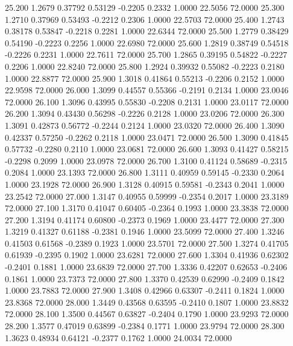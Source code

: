   25.200   1.2679   0.37792   0.53129  -0.2205   0.2332   1.0000  22.5056  72.0000
  25.300   1.2710   0.37969   0.53493  -0.2212   0.2306   1.0000  22.5703  72.0000
  25.400   1.2743   0.38178   0.53847  -0.2218   0.2281   1.0000  22.6344  72.0000
  25.500   1.2779   0.38429   0.54190  -0.2223   0.2256   1.0000  22.6980  72.0000
  25.600   1.2819   0.38749   0.54518  -0.2226   0.2231   1.0000  22.7611  72.0000
  25.700   1.2865   0.39195   0.54822  -0.2227   0.2206   1.0000  22.8240  72.0000
  25.800   1.2924   0.39932   0.55082  -0.2223   0.2180   1.0000  22.8877  72.0000
  25.900   1.3018   0.41864   0.55213  -0.2206   0.2152   1.0000  22.9598  72.0000
  26.000   1.3099   0.44557   0.55366  -0.2191   0.2134   1.0000  23.0046  72.0000
  26.100   1.3096   0.43995   0.55830  -0.2208   0.2131   1.0000  23.0117  72.0000
  26.200   1.3094   0.43430   0.56298  -0.2226   0.2128   1.0000  23.0206  72.0000
  26.300   1.3091   0.42873   0.56772  -0.2244   0.2124   1.0000  23.0320  72.0000
  26.400   1.3090   0.42337   0.57250  -0.2262   0.2118   1.0000  23.0471  72.0000
  26.500   1.3090   0.41845   0.57732  -0.2280   0.2110   1.0000  23.0681  72.0000
  26.600   1.3093   0.41427   0.58215  -0.2298   0.2099   1.0000  23.0978  72.0000
  26.700   1.3100   0.41124   0.58689  -0.2315   0.2084   1.0000  23.1393  72.0000
  26.800   1.3111   0.40959   0.59145  -0.2330   0.2064   1.0000  23.1928  72.0000
  26.900   1.3128   0.40915   0.59581  -0.2343   0.2041   1.0000  23.2542  72.0000
  27.000   1.3147   0.40955   0.59999  -0.2354   0.2017   1.0000  23.3189  72.0000
  27.100   1.3170   0.41047   0.60405  -0.2364   0.1993   1.0000  23.3838  72.0000
  27.200   1.3194   0.41174   0.60800  -0.2373   0.1969   1.0000  23.4477  72.0000
  27.300   1.3219   0.41327   0.61188  -0.2381   0.1946   1.0000  23.5099  72.0000
  27.400   1.3246   0.41503   0.61568  -0.2389   0.1923   1.0000  23.5701  72.0000
  27.500   1.3274   0.41705   0.61939  -0.2395   0.1902   1.0000  23.6281  72.0000
  27.600   1.3304   0.41936   0.62302  -0.2401   0.1881   1.0000  23.6839  72.0000
  27.700   1.3336   0.42207   0.62653  -0.2406   0.1861   1.0000  23.7373  72.0000
  27.800   1.3370   0.42539   0.62990  -0.2409   0.1842   1.0000  23.7883  72.0000
  27.900   1.3408   0.42966   0.63307  -0.2411   0.1824   1.0000  23.8368  72.0000
  28.000   1.3449   0.43568   0.63595  -0.2410   0.1807   1.0000  23.8832  72.0000
  28.100   1.3500   0.44567   0.63827  -0.2404   0.1790   1.0000  23.9293  72.0000
  28.200   1.3577   0.47019   0.63899  -0.2384   0.1771   1.0000  23.9794  72.0000
  28.300   1.3623   0.48934   0.64121  -0.2377   0.1762   1.0000  24.0034  72.0000
